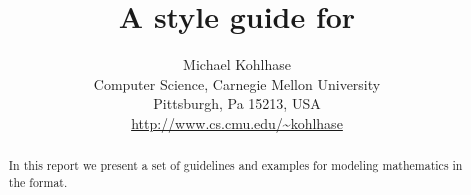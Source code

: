 \documentclass[11pt,twoside,titlepage]{report}
\title{A style guide for {\omdoc}}
\author{Michael Kohlhase\\
  Computer Science, Carnegie Mellon University\\
  Pittsburgh, Pa 15213, USA\\
  {\url{http://www.cs.cmu.edu/~kohlhase}}}
\begin{document}
\maketitle
\setcounter{page}{0}
\begin{abstract}
  In this report we present a set of guidelines and examples for modeling
  mathematics in the {\omdoc} format. 
\end{abstract}
\newpage
\setcounter{tocdepth}{2}\tableofcontents
\newpage{}



\newpage 
 
 
\newpage
{\small}
%
\ednotemessage
\end{document}
